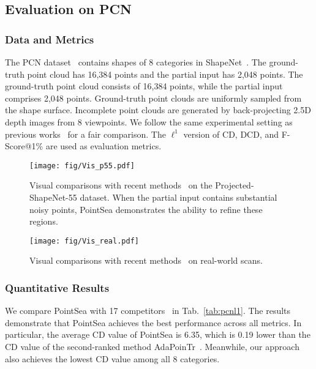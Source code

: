 \subsection{Evaluation on PCN}
\label{secPCN}
\subsubsection{Data and Metrics}
The PCN dataset~\citep{yuan2018pcn} contains shapes of 8 categories in ShapeNet~\citep{chang2015shapenet}. The ground-truth point cloud has 16,384 points and the partial input has 2,048 points. The ground-truth point cloud consists of 16,384 points, while the partial input comprises 2,048 points. Ground-truth point clouds are uniformly sampled from the shape surface. Incomplete point clouds are generated by back-projecting 2.5D depth images from 8 viewpoints. We follow the same experimental setting as previous works~\citep{yuan2018pcn,9928787,10232862,zhou2022seedformer} for a fair comparison. The $\displaystyle \ell^{1}$ version of CD, DCD, and F-Score@1\% are used as evaluation metrics. 


\begin{figure}[h]
  \centering
  \texttt{[image: fig/Vis\_p55.pdf]}
\caption{Visual comparisons with recent methods~\citep{chen2023anchorformer,10232862} on the Projected-ShapeNet-55 dataset. When the partial input contains substantial noisy points, PointSea demonstrates the ability to refine these regions.}
  \label{fig:Vis_p55}
\end{figure}

\begin{figure*}[h]
  \centering
  \texttt{[image: fig/Vis\_real.pdf]}
\caption{Visual comparisons with recent methods~\citep{chen2023anchorformer,10232862} on real-world scans.}
  \label{fig:real}
\end{figure*}


\subsubsection{Quantitative Results}
We compare PointSea with 17 competitors~\citep{yuan2018pcn,xie2020grnet,wang2020cascaded,zhang2020detail,yu2021pointr,9928787,wen2022pmp,yan2022fbnet,zhou2022seedformer,zhang2022point,tang2022lake,fu2023vapcnet,DBLP:journals/ijcv/ZhangLXNZTL23,10097548,chen2023anchorformer,10232862,Zhu_2023_ICCV} in Tab.~\ref{tab:pcnl1}. The results demonstrate that PointSea achieves the best performance across all metrics. In particular, the average CD value of PointSea is 6.35, which is 0.19 lower than the CD value of the second-ranked method AdaPoinTr~\citep{10232862}. Meanwhile, our approach also achieves the lowest CD value among all 8 categories. 


